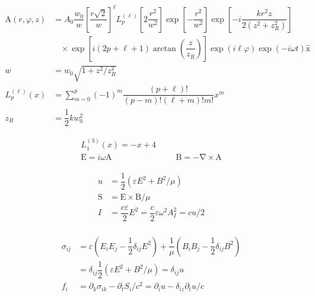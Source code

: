 \documentclass[xcolor=dvipsnames]{beamer}
\newcommand{\f}[2]{\dfrac{#1}{#2}} %
\newcommand{\p}[1]{\left(#1\right)} %
\renewcommand{\sp}[1]{\left[#1\right]} %
\renewcommand{\epsilon}{\varepsilon} %
\renewcommand{\phi}{\varphi} %
\renewcommand{\v}[1]{\boldsymbol{\mathrm{#1}}} %
\newcommand{\uv}[1]{\hat{\boldsymbol{\mathrm{#1}}}} %
\newcommand{\del}{\v\nabla} %
\renewcommand{\d}{\partial} %
\begin{document}
\begin{frame}
  \centering
  \begin{align*}
    \v A\p{r,\phi,z}&=A_0\f{w_0}{w}\sp{\f{r\sqrt 2}{w}}^\ell
    L^{\p{\ell}}_p\sp{2\f{r^2}{w^2}}\exp\sp{-\f{r^2}{w^2}}
    \exp\sp{-i\f{kr^2z}{2\p{z^2+z_R^2}}} \\
    &~~~~\times\exp\sp{i\p{2p+\ell+1}\arctan\p{\f z{z_R}}}
    \exp\p{i\ell\phi}\exp\p{-i\omega t} \uv x\\
    w&=w_0\sqrt{1+z^2/z_R^2}\\
    L^{\p{\ell}}_p\p{x}
    & =\sum_{m=0}^p\p{-1}^m\f{\p{p+\ell}!}{\p{p-m}!\p{\ell+m}!m!}x^m\\
    z_R&=\f12 kw_0^2
  \end{align*}
\end{frame}

\begin{frame}
  \begin{align*}
    L^{\p{3}}_1\p{x}=-x+4\\
    \v E=i\omega\v A &&& \v B=-\del \times\v A
  \end{align*}
\end{frame}

\begin{frame}
  \begin{align*}
    u&=\f12\p{\epsilon E^2+B^2/\mu} \\
    \v S&=\v E\times\v B/\mu \\
    I&=\f{c\epsilon}2E^2=\f c2\epsilon\omega^2A_I^2=cu/2\\
  \end{align*}
\end{frame}

\begin{frame}
  \begin{align*}
    \sigma_{ij}&=\epsilon\p{E_iE_j-\f12\delta_{ij}E^2}
    +\f1\mu\p{B_iB_j-\f12\delta_{ij}B^2} \\
    &=\delta_{ij}\f12\p{\epsilon
      E^2+B^2/\mu}=\delta_{ij}u\\
    f_i&=\d_k\sigma_{ik}-\d_tS_i/c^2=\d_iu-\delta_{iz}\d_tu/c
  \end{align*}
\end{frame}

\end{document}
